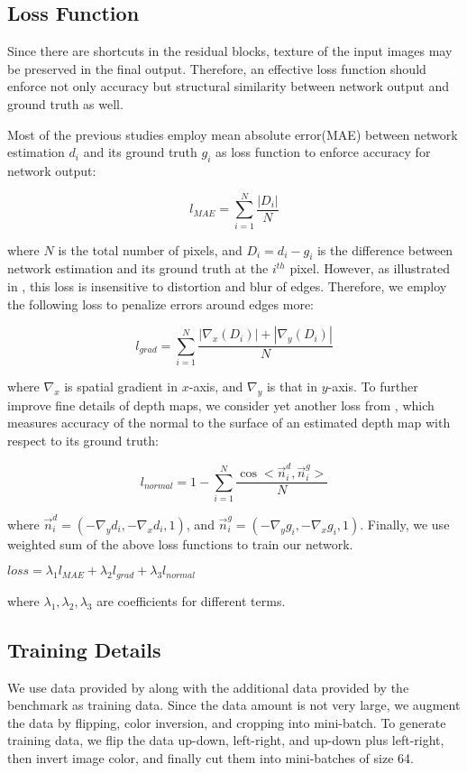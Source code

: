 \documentclass[10pt,twocolumn,letterpaper]{article}
\begin{document}
\subsection{Loss Function}

Since there are shortcuts in the residual blocks, texture of the input images may be preserved in the final output. Therefore, an effective loss function should enforce not only accuracy but structural similarity between network output and ground truth as well.

Most of the previous studies employ mean absolute error(MAE) between network estimation $d_{i}$ and its ground truth $g_{i}$ as loss function to enforce accuracy for network output:

$$l_{MAE} = \sum_{i=1}^{N} \frac{|D_{i}|}{N}$$

where $N$ is the total number of pixels, and $D_{i}=d_{i}-g_{i}$ is the difference between network estimation and its ground truth at the $i^{th}$ pixel. However, as illustrated in \cite{hu2018revisiting}, this loss is insensitive to distortion and blur of edges. Therefore, we employ the following loss to penalize errors around edges more:

$$l_{grad} = \sum_{i=1}^{N} \frac{|\nabla_{x}(D_{i})|+|\nabla_{y}(D_{i})|}{N}$$

where $\nabla_{x}$ is spatial gradient in $x$-axis, and  $\nabla_{y}$ is that in $y$-axis. To further improve fine details of depth maps, we consider yet another loss from \cite{hu2018revisiting}, which measures accuracy of the normal to the surface of an estimated depth map with respect to its ground truth:

$$l_{normal} = 1 - \sum_{i=1}^{N} \frac{\cos <\overrightarrow{n}^{d}_{i}, \overrightarrow{n}^{g}_{i}>}{N}$$

where $\overrightarrow{n}^{d}_{i} = (-\nabla_{y}d_{i}, -\nabla_{x}d_{i}, 1)$, and $\overrightarrow{n}^{g}_{i} = (-\nabla_{y}g_{i}, -\nabla_{x}g_{i}, 1)$. Finally, we use weighted sum of the above loss functions to train our network.

$loss = \lambda_{1}l_{MAE}+\lambda_{2}l_{grad}+\lambda_{3}l_{normal} $

where $\lambda_{1}, \lambda_{2}, \lambda_{3}$ are coefficients for different terms.
      

\subsection{Training Details}

We use data provided by \cite{alperovich2018light} along with the additional data provided by the benchmark \cite{honauer2016dataset} as training data. Since the data amount is not very large, we augment the data by flipping, color inversion, and cropping into mini-batch. To generate training data, we flip the data up-down, left-right, and up-down plus left-right, then invert image color, and finally cut them into mini-batches of size 64.
\end{document}
